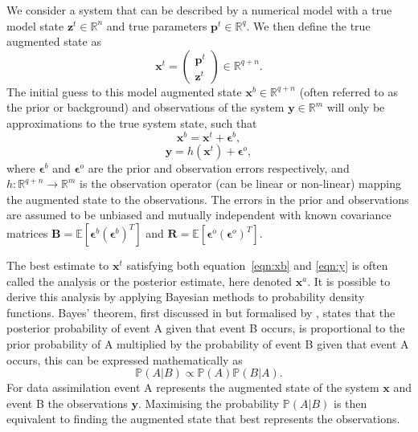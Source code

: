 We consider a system that can be described by a numerical model with a true model state \(\textbf{z}^{t} \in \mathbb{R}^{n}\) and true parameters \(\textbf{p}^{t} \in \mathbb{R}^{q}\). We then define the true augmented state as
\begin{equation}
\textbf{x}^{t} =
\begin{pmatrix}
\textbf{p}^{t} \\
\textbf{z}^{t}
\end{pmatrix}
\in \mathbb{R}^{q+n}.
\end{equation}
The initial guess to this model augmented state \(\textbf{x}^{b} \in \mathbb{R}^{q+n}\) (often referred to as the prior or background) and observations of the system \(\textbf{y} \in \mathbb{R}^{m}\) will only be approximations to the true system state, such that
\begin{equation}
\textbf{x}^{b} = \textbf{x}^{t} + \bm{\epsilon}^{b}, \label{eqn:xb}
\end{equation} 
\begin{equation}
\textbf{y} = h(\textbf{x}^{t}) + \bm{\epsilon}^{o}, \label{eqn:y}
\end{equation} 
where \( \bm{\epsilon}^{b}\) and \( \bm{\epsilon}^{o}\) are the prior and observation errors respectively, and \(h: \mathbb{R}^{q+n}\rightarrow \mathbb{R}^{m}\) is the observation operator (can be linear or non-linear) mapping the augmented state to the observations. The errors in the prior and observations are assumed to be unbiased and mutually independent with known covariance matrices \(\textbf{B} = \mathbb{E}[\bm{\epsilon}^{b}(\bm{\epsilon}^{b})^{T}]\) and \(\textbf{R} = \mathbb{E}[\bm{\epsilon}^{o}(\bm{\epsilon}^{o})^{T}]\).

The best estimate to \(\textbf{x}^{t}\) satisfying both equation~\eqref{eqn:xb} and \eqref{eqn:y} is often called the analysis or the posterior estimate, here denoted \(\textbf{x}^{a}\). It is possible to derive this analysis by applying Bayesian methods to probability density functions. Bayes' theorem, first discussed in \citet{bayes1763} but formalised by \citet{laplace1781memoire}, states that the posterior probability of event A given that event B occurs, is proportional to the prior probability of A multiplied by the probability of event B given that event A occurs, this can be expressed mathematically as
\begin{equation}
\mathbb{P}(A|B) \propto \mathbb{P}(A)\mathbb{P}(B|A). \label{eqn:bayes}
\end{equation}
For data assimilation event A represents the augmented state of the system \(\textbf{x}\) and event B the observations \(\textbf{y}\). Maximising the probability \(\mathbb{P}(A|B)\) is then equivalent to finding the augmented state that best represents the observations. 

